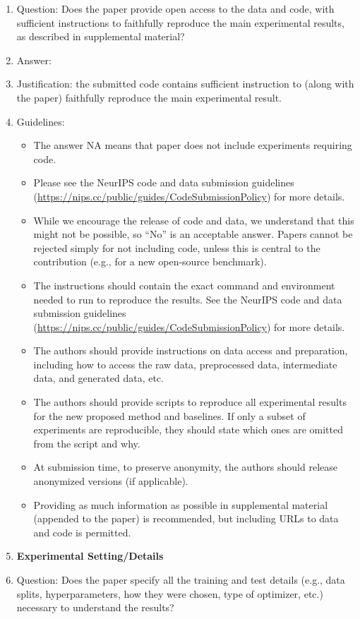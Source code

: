 \documentclass{article}
\begin{document}
\begin{enumerate}
    \item[] Question: Does the paper provide open access to the data and code, with sufficient instructions to faithfully reproduce the main experimental results, as described in supplemental material?
    \item[] Answer: \answerYes{}
    \item[] Justification: the submitted code contains sufficient instruction to (along with the paper) faithfully reproduce the main experimental result.
    \item[] Guidelines:
    \begin{itemize}
        \item The answer NA means that paper does not include experiments requiring code.
        \item Please see the NeurIPS code and data submission guidelines (\url{https://nips.cc/public/guides/CodeSubmissionPolicy}) for more details.
        \item While we encourage the release of code and data, we understand that this might not be possible, so “No” is an acceptable answer. Papers cannot be rejected simply for not including code, unless this is central to the contribution (e.g., for a new open-source benchmark).
        \item The instructions should contain the exact command and environment needed to run to reproduce the results. See the NeurIPS code and data submission guidelines (\url{https://nips.cc/public/guides/CodeSubmissionPolicy}) for more details.
        \item The authors should provide instructions on data access and preparation, including how to access the raw data, preprocessed data, intermediate data, and generated data, etc.
        \item The authors should provide scripts to reproduce all experimental results for the new proposed method and baselines. If only a subset of experiments are reproducible, they should state which ones are omitted from the script and why.
        \item At submission time, to preserve anonymity, the authors should release anonymized versions (if applicable).
        \item Providing as much information as possible in supplemental material (appended to the paper) is recommended, but including URLs to data and code is permitted.
    \end{itemize}
\item {\bf Experimental Setting/Details}
    \item[] Question: Does the paper specify all the training and test details (e.g., data splits, hyperparameters, how they were chosen, type of optimizer, etc.) necessary to understand the results?

\end{enumerate}
\end{document}
